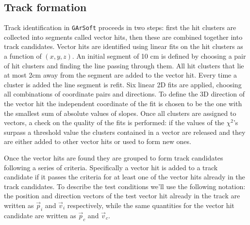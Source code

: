 \subsection{Track formation}
\label{GArSoft_TrackForming}
Track identification in \texttt{GArSoft} proceeds in two steps: first the hit clusters are collected into segments called vector hits, then these are combined together into track candidates. Vector hits are identified using linear fits on the hit clusters as a function of $(x,y,z)$. An initial segment of 10 cm is defined by choosing a pair of hit clusters and finding the line passing through them. All hit clusters that lie at most 2cm away from the segment are added to the vector hit. Every time a cluster is added the line segment is refit. Six linear 2D fits are applied, choosing all combinations of coordinate pairs and directions. To define the 3D direction of the vector hit the independent coordinate of the fit is chosen to be the one with the smallest sum of absolute values of slopes. Once all clusters are assigned to vectors, a check on the quality of the fits is performed: if the values of the $\chi^2$'s surpass a threshold value the clusters contained in a vector are released and they are either added to other vector hits or used to form new ones.

Once the vector hits are found they are grouped to form track candidates following a series of criteria. Specifically a vector hit is added to a track candidate if it passes the criteria for at least one of the vector hits already in the track candidates. To describe the test conditions we'll use the following notation: the position and direction vectors of the test vector hit already in the track are written as $\Vec{p}_i$ and $\Vec{v}_i$ respectively, while the same quantities for the vector hit candidate are written as $\Vec{p}_c$ and $\Vec{v}_c$.

